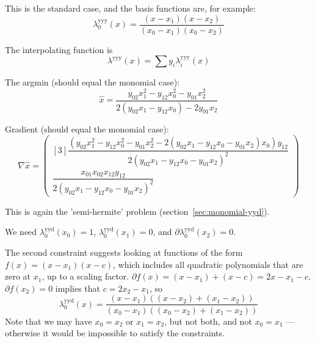 
This is the standard case, and the basis functions are,
for example:
\begin{equation}
\lambda^{\text{yyy}}_0(x) = 
\frac {(x - x_1) (x - x_2)} {(x_0 - x_1) (x_0 - x_2)}
\end{equation}

The interpolating function is 
\begin{equation}
\lambda^{\text{yyy}}(x) = 
\sum y_i \lambda^{\text{yyy}}_i(x)
\end{equation}

The argmin (should equal the monomial case):
\begin{equation}
\hat{x} = 
\dfrac{y_{02} x_1^{2}-y_{12} x_0^{2}-y_{01} x_2^{2}
}{
2 \left(y_{02} x_1-y_{12} x_0\right)-2 y_{01} x_2
}
\end{equation}

Gradient (should equal the monomial case):
\begin{equation}
\nabla \hat{x} =
\begin{pmatrix}[3]
\dfrac{
\left(y_{02} x_1^{2}-y_{12} x_0^{2}-y_{01} x_2^{2}
-2 \left(y_{02} x_1-y_{12} x_0-y_{01} x_2\right) x_0\right) y_{12}
}{
2 \left(y_{02} x_1-y_{12} x_0-y_{01} x_2 \right)^{2}
}
\\
\dfrac{
x_{01} x_{02} x_{12} y_{12}
}{
2 \left(y_{02} x_1-y_{12} x_0-y_{01} x_2\right)^{2}
}
\end{pmatrix}
\end{equation}

\label{sec:lagrange-yyd}

This is again the 'semi-hermite' problem (section~\ref{sec:monomial-yyd}).

We need 
$\lambda^{\text{yyd}}_0(x_0) = 1$, 
$\lambda^{\text{yyd}}_0(x_1) = 0$, and
$\partial\lambda^{\text{yyd}}_0(x_2) = 0$. 

The second constraint suggests looking at functions of the form
$f(x) = (x - x_1) (x - c)$, which includes all quadratic 
polynomials that are zero at $x_1$, up to a scaling factor.  
$\partial{f}(x) = (x - x_1) + (x - c) = 2 x - x_1 - c$.
$\partial{f}(x_2) = 0$ implies that
$c = 2 x_2 - x_1$,
so
\begin{equation}
\lambda^{\text{yyd}}_0(x) = 
\frac 
{(x - x_1) \left( (x - x_2) + (x_1 - x_2) \right)} 
{(x_0 - x_1) ((x_0 - x_2) + (x_1 - x_2))}
\end{equation}
Note that we may have $x_0 = x_2$ or $x_1 = x_2$, but not both,
and not $x_0 = x_1$ --- otherwise it would be impossible to 
satisfy the constraints.

